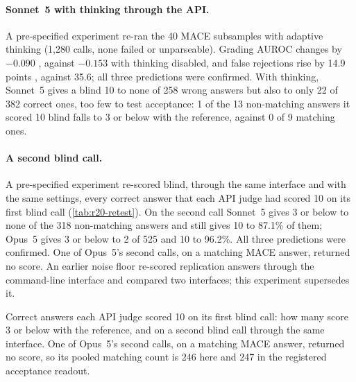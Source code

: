 \paragraph{Sonnet~5 with thinking through the API.}
A pre-specified experiment re-ran the 40 \textsc{MACE} subsamples with adaptive thinking (1,280 calls, none failed or unparseable). Grading AUROC changes by $-0.090$ , against $-0.153$ with thinking disabled, and false rejections rise by 14.9 points , against 35.6; all three predictions were confirmed. With thinking, Sonnet~5 gives a blind 10 to none of 258 wrong answers but also to only 22 of 382 correct ones, too few to test acceptance: 1 of the 13 non-matching answers it scored 10 blind falls to 3 or below with the reference, against 0 of 9 matching ones.

\paragraph{A second blind call.}
A pre-specified experiment re-scored blind, through the same interface and with the same settings, every correct answer that each API judge had scored 10 on its first blind call (\cref{tab:r20-retest}). On the second call Sonnet~5 gives 3 or below to none of the 318 non-matching answers and still gives 10 to 87.1\% of them; Opus~5 gives 3 or below to 2 of 525 and 10 to 96.2\%. All three predictions were confirmed. One of Opus~5's second calls, on a matching \textsc{MACE} answer, returned no score. An earlier noise floor re-scored replication answers through the command-line interface and compared two interfaces; this experiment supersedes it.

\begin{table}[htbp]
\centering
\caption{Correct answers each API judge scored 10 on its first blind call: how many score 3 or below with the reference, and on a second blind call through the same interface. One of Opus~5's second calls, on a matching \textsc{MACE} answer, returned no score, so its pooled matching count is 246 here and 247 in the registered acceptance readout.\pre}
\label{tab:r20-retest}
\footnotesize
\begin{adjustbox}{max width=\linewidth}\end{adjustbox}
\end{table}


